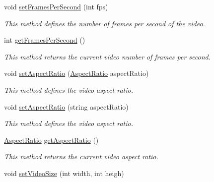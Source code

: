\begin{DoxyCompactItemize}
void \hyperlink{classbr_1_1ufscar_1_1lince_1_1xpta_1_1streaming_1_1AVEncoder_a942b6dc55d94adb7df4531cd04794552}{setFramesPerSecond} (int fps)
\begin{DoxyCompactList}\small\item\em This method defines the number of frames per second of the video. \item\end{DoxyCompactList}\item 
int \hyperlink{classbr_1_1ufscar_1_1lince_1_1xpta_1_1streaming_1_1AVEncoder_acca482f1651fe26c47bb267ee4b49985}{getFramesPerSecond} ()
\begin{DoxyCompactList}\small\item\em This method returns the current video number of frames per second. \item\end{DoxyCompactList}\item 
void \hyperlink{classbr_1_1ufscar_1_1lince_1_1xpta_1_1streaming_1_1AVEncoder_a9c9c36be5f81a78a2172d5779893f3b6}{setAspectRatio} (\hyperlink{namespacebr_1_1ufscar_1_1lince_1_1xpta_1_1streaming_a252e3034c41c058052743c39f2e66103}{AspectRatio} aspectRatio)
\begin{DoxyCompactList}\small\item\em This method defines the video aspect ratio. \item\end{DoxyCompactList}\item 
void \hyperlink{classbr_1_1ufscar_1_1lince_1_1xpta_1_1streaming_1_1AVEncoder_af84532eb71a0a2fea01d8cac6a4e3915}{setAspectRatio} (string aspectRatio)
\begin{DoxyCompactList}\small\item\em This method defines the video aspect ratio. \item\end{DoxyCompactList}\item 
\hyperlink{namespacebr_1_1ufscar_1_1lince_1_1xpta_1_1streaming_a252e3034c41c058052743c39f2e66103}{AspectRatio} \hyperlink{classbr_1_1ufscar_1_1lince_1_1xpta_1_1streaming_1_1AVEncoder_a6cf4a940089410c06c126a13e57fe157}{getAspectRatio} ()
\begin{DoxyCompactList}\small\item\em This method returns the current video aspect ratio. \item\end{DoxyCompactList}\item 
void \hyperlink{classbr_1_1ufscar_1_1lince_1_1xpta_1_1streaming_1_1AVEncoder_ae99cf71b93bc17447fdc85df534e58d7}{setVideoSize} (int width, int heigh)

\end{DoxyCompactItemize}
